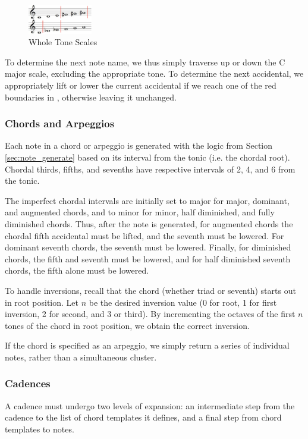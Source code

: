 \documentclass{article}
\begin{document}
\vspace{-2mm}
\begin{figure}[h!]
\centering
\includegraphics[width=0.25\textwidth]{images/whole_tone}
\caption{Whole Tone Scales}
\label{whole_tone}
\vspace{-6mm}
\end{figure}
\newpage
To determine the next note name, we thus simply traverse up or down the C major scale, excluding the appropriate tone. To determine the next accidental, we appropriately lift or lower the current accidental if we reach one of the red boundaries in , otherwise leaving it unchanged.

\subsubsection{Chords and Arpeggios}
\label{sec:chord_expansion}
Each note in a chord or arpeggio is generated with the logic from Section \ref{sec:note_generate} based on its interval from the tonic (i.e. the chordal root). Chordal thirds, fifths, and sevenths have respective intervals of 2, 4, and 6 from the tonic.

The imperfect chordal intervals are initially set to major for major, dominant, and augmented chords, and to minor for minor, half diminished, and fully diminished chords. Thus, after the note is generated, for augmented chords the chordal fifth accidental must be lifted, and the seventh must be lowered. For dominant seventh chords, the seventh must be lowered. Finally, for diminished chords, the fifth and seventh must be lowered, and for half diminished seventh chords, the fifth alone must be lowered.

To handle inversions, recall that the chord (whether triad or seventh) starts out in root position. Let $n$ be the desired inversion value (0 for root, 1 for first inversion, 2 for second, and 3 or third). By incrementing the octaves of the first $n$ tones of the chord in root position, we obtain the correct inversion.

If the chord is specified as an arpeggio, we simply return a series of individual notes, rather than a simultaneous cluster.

\subsubsection{Cadences}
A cadence must undergo two levels of expansion: an intermediate step from the cadence to the list of chord templates it defines, and a final step from chord templates to notes.
\end{document}
